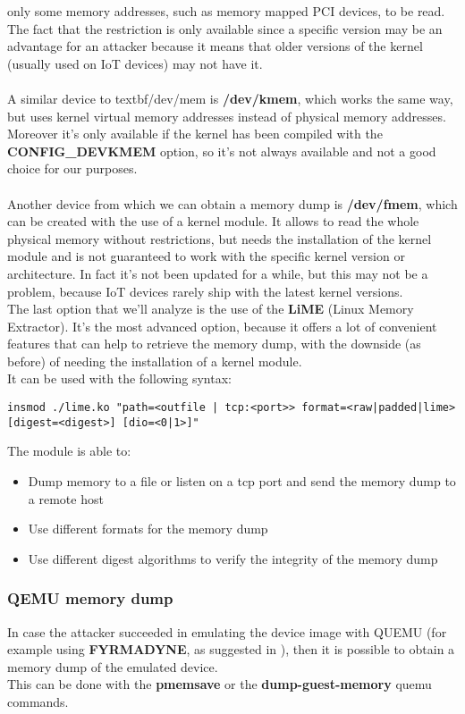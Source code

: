 only some memory addresses, such as memory mapped PCI devices, to be read.
The fact that the restriction is only available since a specific version may be an advantage for an attacker
because it means that older versions of the kernel (usually used on IoT devices) may not have it.\\\\
A similar device to textbf{/dev/mem} is \textbf{/dev/kmem}, which works the same 
way, but uses kernel virtual memory addresses instead of physical memory addresses.\\
Moreover it's only available if the kernel has been compiled with the \textbf{CONFIG\_DEVKMEM} option, so 
it's not always available and not a good choice for our purposes.\\\\
Another device from which we can obtain a memory dump is \textbf{/dev/fmem}\cite{dev-fmem}, which
can be created with the use of a kernel module. It allows to read the whole physical memory
without restrictions, but needs the installation of the kernel module and is not guaranteed to 
work with the specific kernel version or architecture. In fact it's not been updated
for a while, but this may not be a problem, because IoT devices rarely ship with the latest
kernel versions.\\
The last option that we'll analyze is the use of the \textbf{LiME} (Linux Memory Extractor)\cite{lime}.
It's the most advanced option, because it offers a lot of convenient
features that can help to retrieve the memory dump, with the downside (as before)
of needing the installation of a kernel module.\\
It can be used with the following syntax:
\begin{lstlisting}[numbers=none]
    insmod ./lime.ko "path=<outfile | tcp:<port>> format=<raw|padded|lime> [digest=<digest>] [dio=<0|1>]"
\end{lstlisting}
The module is able to:
\begin{itemize}
    \item Dump memory to a file or listen on a tcp port and send the memory dump to a remote host
    \item Use different formats for the memory dump
    \item Use different digest algorithms to verify the integrity of the memory dump 
\end{itemize}
\subsubsection{QEMU memory dump}
In case the attacker succeeded in emulating the device image with QUEMU (for example
using \textbf{FYRMADYNE}\cite{firmadyne}, as suggested in \cite{previouswork}), then it is possible
to obtain a memory dump of the emulated device.\\
This can be done with the \textbf{pmemsave} or the \textbf{dump-guest-memory} quemu commands.\\
